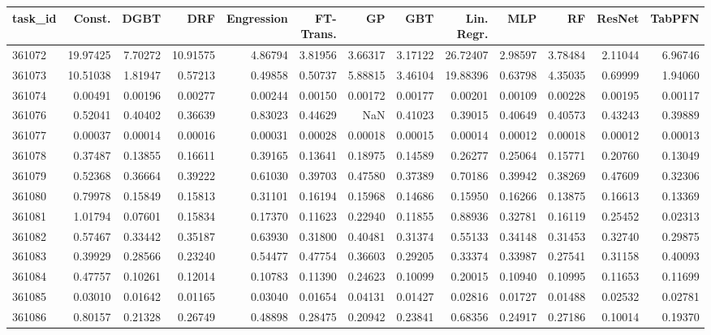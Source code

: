 \begin{tabular}{lrrrrrrrrrrrr}
\toprule
task\_id & Const. & DGBT & DRF & Engression & FT-Trans. & GP & GBT & Lin. Regr. & MLP & RF & ResNet & TabPFN \\
\midrule
361072 & 19.97425 & 7.70272 & 10.91575 & 4.86794 & 3.81956 & 3.66317 & 3.17122 & 26.72407 & 2.98597 & 3.78484 & 2.11044 & 6.96746 \\
361073 & 10.51038 & 1.81947 & 0.57213 & 0.49858 & 0.50737 & 5.88815 & 3.46104 & 19.88396 & 0.63798 & 4.35035 & 0.69999 & 1.94060 \\
361074 & 0.00491 & 0.00196 & 0.00277 & 0.00244 & 0.00150 & 0.00172 & 0.00177 & 0.00201 & 0.00109 & 0.00228 & 0.00195 & 0.00117 \\
361076 & 0.52041 & 0.40402 & 0.36639 & 0.83023 & 0.44629 & NaN & 0.41023 & 0.39015 & 0.40649 & 0.40573 & 0.43243 & 0.39889 \\
361077 & 0.00037 & 0.00014 & 0.00016 & 0.00031 & 0.00028 & 0.00018 & 0.00015 & 0.00014 & 0.00012 & 0.00018 & 0.00012 & 0.00013 \\
361078 & 0.37487 & 0.13855 & 0.16611 & 0.39165 & 0.13641 & 0.18975 & 0.14589 & 0.26277 & 0.25064 & 0.15771 & 0.20760 & 0.13049 \\
361079 & 0.52368 & 0.36664 & 0.39222 & 0.61030 & 0.39703 & 0.47580 & 0.37389 & 0.70186 & 0.39942 & 0.38269 & 0.47609 & 0.32306 \\
361080 & 0.79978 & 0.15849 & 0.15813 & 0.31101 & 0.16194 & 0.15968 & 0.14686 & 0.15950 & 0.16266 & 0.13875 & 0.16613 & 0.13369 \\
361081 & 1.01794 & 0.07601 & 0.15834 & 0.17370 & 0.11623 & 0.22940 & 0.11855 & 0.88936 & 0.32781 & 0.16119 & 0.25452 & 0.02313 \\
361082 & 0.57467 & 0.33442 & 0.35187 & 0.63930 & 0.31800 & 0.40481 & 0.31374 & 0.55133 & 0.34148 & 0.31453 & 0.32740 & 0.29875 \\
361083 & 0.39929 & 0.28566 & 0.23240 & 0.54477 & 0.47754 & 0.36603 & 0.29205 & 0.33374 & 0.33987 & 0.27541 & 0.31158 & 0.40093 \\
361084 & 0.47757 & 0.10261 & 0.12014 & 0.10783 & 0.11390 & 0.24623 & 0.10099 & 0.20015 & 0.10940 & 0.10995 & 0.11653 & 0.11699 \\
361085 & 0.03010 & 0.01642 & 0.01165 & 0.03040 & 0.01654 & 0.04131 & 0.01427 & 0.02816 & 0.01727 & 0.01488 & 0.02532 & 0.02781 \\
361086 & 0.80157 & 0.21328 & 0.26749 & 0.48898 & 0.28475 & 0.20942 & 0.23841 & 0.68356 & 0.24917 & 0.27186 & 0.10014 & 0.19370 \\

\end{tabular}
